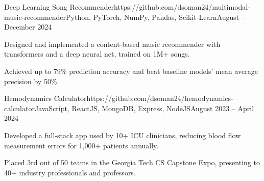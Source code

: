 \documentclass{article}
\begin{document}
\begin{flushleft}

    \vspace{3pt}

    \begin{project}{Deep Learning Song Recommender}{https://github.com/dsoman24/multimodal-music-recommender}{Python, PyTorch, NumPy, Pandas, Scikit-Learn}{August -- December 2024}
        \item Designed and implemented a content-based music recommender with transformers and a deep neural net, trained on 1M+ songs.
        \item Achieved up to 79\% prediction accuracy and beat baseline models' mean average precision by 50\%.
    \end{project}

    \begin{project}{Hemodynamics Calculator}{https://github.com/dsoman24/hemodynamics-calculator}{JavaScript, ReactJS, MongoDB, Express, NodeJS}{August 2023 -- April 2024}
        \item Developed a full-stack app used by 10+ ICU clinicians, reducing blood flow measurement errors for 1,000+ patients annually.
        \item Placed 3rd out of 50 teams in the Georgia Tech CS Capstone Expo, presenting to 40+ industry professionals and professors.
    \end{project}




    \vspace{3pt}
     \\
     \\
     \\

\end{flushleft}
\end{document}
